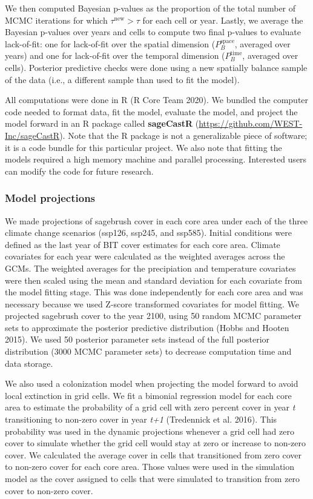 \documentclass[
  12pt,
]{article}
\begin{document}
\noindent{}We then computed Bayesian p-values as the proportion of the total number of MCMC iterations for which \(\tau^{\text{new}} > \tau\) for each cell or year.
Lastly, we average the Bayesian p-values over years and cells to compute two final p-values to evaluate lack-of-fit: one for lack-of-fit over the spatial dimension (\(P_B^{\text{space}}\), averaged over years) and one for lack-of-fit over the temporal dimension (\(P_B^{\text{time}}\), averaged over cells).
Posterior predictive checks were done using a new spatially balance sample of the data (i.e., a different sample than used to fit the model).

All computations were done in R (R Core Team 2020).
We bundled the computer code needed to format data, fit the model, evaluate the model, and project the model forward in an R package called \textbf{sageCastR} (\url{https://github.com/WEST-Inc/sageCastR}).
Note that the R package is not a generalizable piece of software; it is a code bundle for this particular project.
We also note that fitting the models required a high memory machine and parallel processing.
Interested users can modify the code for future research.

\hypertarget{model-projections}{%
\subsubsection{Model projections}\label{model-projections}}

We made projections of sagebrush cover in each core area under each of the three climate change scenarios (ssp126, ssp245, and ssp585).
Initial conditions were defined as the last year of BIT cover estimates for each core area.
Climate covariates for each year were calculated as the weighted averages across the GCMs.
The weighted averages for the precipiation and temperature covariates were then scaled using the mean and standard deviation for each covariate from the model fitting stage.
This was done independently for each core area and was necessary because we used Z-score transformed covariates for model fitting.
We projected sagebrush cover to the year 2100, using 50 random MCMC parameter sets to approximate the posterior predictive distribution (Hobbs and Hooten 2015).
We used 50 posterior parameter sets instead of the full posterior distribution (3000 MCMC parameter sets) to decrease computation time and data storage.

We also used a colonization model when projecting the model forward to avoid local extinction in grid cells.
We fit a bimonial regression model for each core area to estimate the probability of a grid cell with zero percent cover in year \emph{t} transitioning to non-zero cover in year \emph{t+1} (Tredennick et al. 2016).
This probability was used in the dynamic projections whenever a grid cell had zero cover to simulate whether the grid cell would stay at zero or increase to non-zero cover.
We calculated the average cover in cells that transitioned from zero cover to non-zero cover for each core area.
Those values were used in the simulation model as the cover assigned to cells that were simulated to transition from zero cover to non-zero cover.
\end{document}
